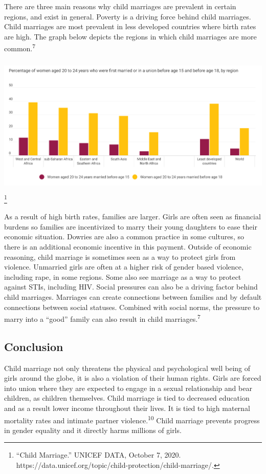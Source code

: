 \documentclass[10pt, letterpaper]{article}
\begin{document}
There are three main reasons why child marriages are prevalent in
certain regions, and exist in general. Poverty is a driving force behind
child marriages. Child marriages are most prevalent in less developed
countries where birth rates are high. The graph below depicts the
regions in which child marriages are more common.\textsuperscript{7} \\
\begin{center}
    \includegraphics[width=5.67188in,height=2.63225in]{image1.png}\footnote{``Child
  Marriage.'' UNICEF DATA, October 7, 2020.
  https://data.unicef.org/topic/child-protection/child-marriage/.} \\
\end{center}
As a result of high birth rates, families are larger. Girls are often
seen as financial burdens so families are incentivized to marry their
young daughters to ease their economic situation. Dowries are also a
common practice in some cultures, so there is an additional economic
incentive in this payment. Outside of economic reasoning, child marriage
is sometimes seen as a way to protect girls from violence. Unmarried
girls are often at a higher risk of gender based violence, including
rape, in some regions. Some also see marriage as a way to protect
against STIs, including HIV. Social pressures can also be a driving
factor behind child marriages. Marriages can create connections between
families and by default connections between social statuses. Combined
with social norms, the pressure to marry into a ``good'' family can also
result in child marriages.\textsuperscript{7} \\

\subsection{Conclusion}

Child marriage not only threatens the physical and psychological well
being of girls around the globe, it is also a violation of their human
rights. Girls are forced into union where they are expected to engage in
a sexual relationship and bear children, as children themselves. Child
marriage is tied to decreased education and as a result lower income
throughout their lives. It is tied to high maternal mortality rates and
intimate partner violence.\textsuperscript{10} Child marriage prevents
progress in gender equality and it directly harms millions of girls.
\end{document}
